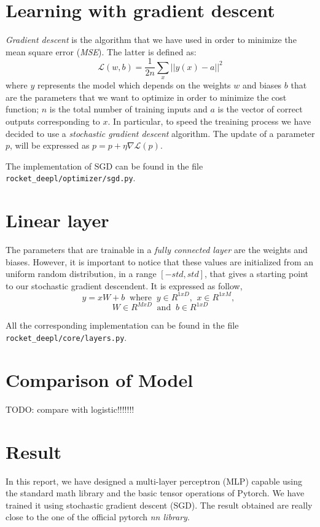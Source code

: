 \documentclass[journal, a4paper]{IEEEtran}
\begin{document}
\section{Learning with gradient descent}
\label{sec:learning}
\textit{Gradient descent} is the algorithm that we have used in order to minimize the mean square error (\textit{MSE}). The latter is defined as:
$$\mathcal{L}(w, b) = \frac{1}{2n} \sum_x ||y(x) - a||^2 $$
where $y$ represents the model which depends on the weights $w$ and biases $b$ that are the parameters that we want to optimize in order to minimize the cost function; $n$ is the total number of training inputs and $a$ is the vector of correct outputs corresponding to $x$. In particular, to speed the treaining process we have decided to use a \textit{stochastic gradient descent} algorithm. 
The update of a parameter $p$, will be expressed as 
$ p = p + \eta \nabla \mathcal{L} (p)$.
\cite{reference1}

The implementation of SGD can be found in the file \texttt{rocket\_deepl/optimizer/sgd.py}.

\section{Linear layer}
\label{sec:linearl}
The parameters that are trainable in a  \textit{fully connected layer} are the weights and biases. However, it is important to notice that these values are initialized from an uniform random distribution, in a range $[-std, std]$, that gives a starting point to our stochastic gradient descendent. It is expressed as follow,
$$ y = xW + b\;\;\mbox{where}\;\;y\in R^{1xD}\mbox{,} \;\; x \in R^{1xM}\mbox{,}\;\;$$$$ W\in R^{MxD}\;\;\mbox{and}\;\;b \in R^{1xD} $$

All the corresponding implementation can be found in the file \texttt{rocket\_deepl/core/layers.py}.

\section{Comparison of Model}
{\Huge{TODO: compare with logistic!!!!!!!}}

\section{Result}
In this report, we have designed a multi-layer perceptron (MLP) capable using the standard math library and the basic tensor operations of Pytorch. We have trained it using stochastic gradient descent (SGD). The result obtained are really close to the one of the official pytorch \textit{nn library}.
\end{document}
